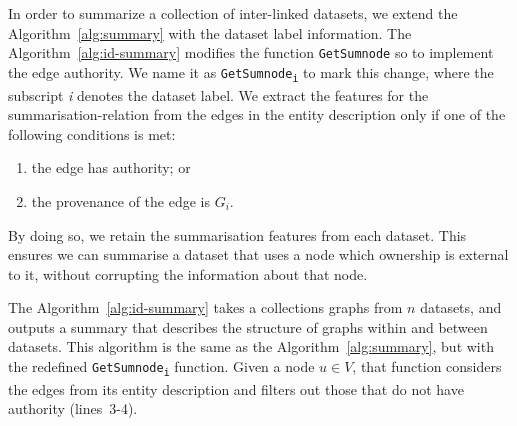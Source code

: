 In order to summarize a collection of inter-linked datasets, we extend the Algorithm~\ref{alg:summary} with the dataset label information.
The Algorithm~\ref{alg:id-summary} modifies the function \texttt{GetSumnode} so to implement the edge authority.
We name it as \texttt{GetSumnode\textsubscript{i}} to mark this change, where the subscript \emph{i} denotes the dataset label.
We extract the features for the \gls{summarisation-relation} from the edges in the entity description  only if one of the following conditions is met:
\begin{enumerate}
\item the edge has authority; or
\item the provenance of the edge is $G_i$.
\end{enumerate}
By doing so, we retain the summarisation features from each dataset. This ensures we can summarise a dataset that uses a node which ownership is external to it, without corrupting the information about that node.%

The Algorithm~\ref{alg:id-summary} takes a collections graphs from $n$ datasets, and outputs a summary that describes the structure of graphs within and between datasets. This algorithm is the same as the Algorithm~\ref{alg:summary}, but with the redefined \texttt{GetSumnode\textsubscript{i}} function. Given a node $u \in V$, that function considers the edges from its entity description and filters out those that do not have authority (lines~3-4).

